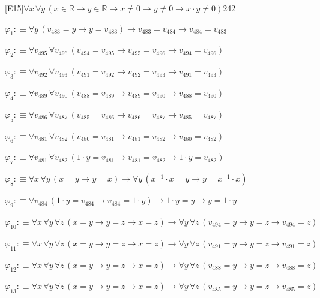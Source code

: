 \begin{fullproof}{[E15]}{$\forall x\,\forall y\,(x \in \mathbb{R} \to y \in \mathbb{R} \to x \neq 0 \to y \neq 0 \to x \cdot y \neq 0)$}{242}
\begin{ptree}
\end{ptree}
\begin{abbrevlist}
\item $\varphi_{1} :\equiv \forall y\,(v_{483} = y \to y = v_{483}) \to v_{483} = v_{484} \to v_{484} = v_{483}$
\item $\varphi_{2} :\equiv \forall v_{495}\,\forall v_{496}\,(v_{494} = v_{495} \to v_{495} = v_{496} \to v_{494} = v_{496})$
\item $\varphi_{3} :\equiv \forall v_{492}\,\forall v_{493}\,(v_{491} = v_{492} \to v_{492} = v_{493} \to v_{491} = v_{493})$
\item $\varphi_{4} :\equiv \forall v_{489}\,\forall v_{490}\,(v_{488} = v_{489} \to v_{489} = v_{490} \to v_{488} = v_{490})$
\item $\varphi_{5} :\equiv \forall v_{486}\,\forall v_{487}\,(v_{485} = v_{486} \to v_{486} = v_{487} \to v_{485} = v_{487})$
\item $\varphi_{6} :\equiv \forall v_{481}\,\forall v_{482}\,(v_{480} = v_{481} \to v_{481} = v_{482} \to v_{480} = v_{482})$
\item $\varphi_{7} :\equiv \forall v_{481}\,\forall v_{482}\,(1 \cdot y = v_{481} \to v_{481} = v_{482} \to 1 \cdot y = v_{482})$
\item $\varphi_{8} :\equiv \forall x\,\forall y\,(x = y \to y = x) \to \forall y\,(x^{-1} \cdot x = y \to y = x^{-1} \cdot x)$
\item $\varphi_{9} :\equiv \forall v_{484}\,(1 \cdot y = v_{484} \to v_{484} = 1 \cdot y) \to 1 \cdot y = y \to y = 1 \cdot y$
\item $\varphi_{10} :\equiv \forall x\,\forall y\,\forall z\,(x = y \to y = z \to x = z) \to \forall y\,\forall z\,(v_{494} = y \to y = z \to v_{494} = z)$
\item $\varphi_{11} :\equiv \forall x\,\forall y\,\forall z\,(x = y \to y = z \to x = z) \to \forall y\,\forall z\,(v_{491} = y \to y = z \to v_{491} = z)$
\item $\varphi_{12} :\equiv \forall x\,\forall y\,\forall z\,(x = y \to y = z \to x = z) \to \forall y\,\forall z\,(v_{488} = y \to y = z \to v_{488} = z)$
\item $\varphi_{13} :\equiv \forall x\,\forall y\,\forall z\,(x = y \to y = z \to x = z) \to \forall y\,\forall z\,(v_{485} = y \to y = z \to v_{485} = z)$

\end{abbrevlist}
\end{fullproof}

